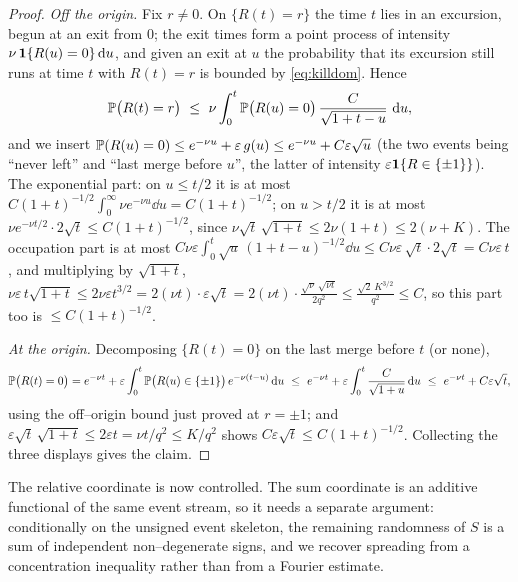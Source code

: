 \documentclass[11pt]{article}
\theoremstyle{plain}
\theoremstyle{definition}
\theoremstyle{remark}
\newcommand{\eps}{\varepsilon}\newcommand{\Exp}{\mathrm{Exp}}
\begin{document}
\begin{proof}
\emph{Off the origin.} Fix $r\ne0$. On $\{R(t)=r\}$ the time $t$ lies in an excursion,
begun at an exit from $0$; the exit times form a point process of intensity
$\nu\,\mathbf 1\{R(u)=0\}\,\mathrm{d} u$, and given an exit at $u$ the probability that its
excursion still runs at time $t$ with $R(t)=r$ is bounded by \eqref{eq:killdom}.
Hence
\[
  \PP\big(R(t)=r\big)\ \le\ \nu\int_0^t\PP\big(R(u)=0\big)\,
  \frac{C}{\sqrt{1+t-u}}\,\dd u,
\]
and we insert $\PP(R(u)=0)\le e^{-\nu u}+\eps\,g(u)\le e^{-\nu u}+C\eps\sqrt u$ (the
two events being ``never left'' and ``last merge before $u$'', the latter of
intensity $\eps\bone\{R\in\{\pm1\}\}$). The exponential part: on $u\le t/2$ it is at
most $C(1+t)^{-1/2}\int_0^\infty\nu e^{-\nu u}\dd u=C(1+t)^{-1/2}$; on $u>t/2$ it is
at most $\nu e^{-\nu t/2}\cdot2\sqrt t\le C(1+t)^{-1/2}$, since
$\nu\sqrt t\,\sqrt{1+t}\le2\nu(1+t)\le2(\nu+K)$. The occupation part is at most
$C\nu\eps\int_0^t\sqrt u\,(1+t-u)^{-1/2}\dd u\le C\nu\eps\,\sqrt t\cdot2\sqrt t
=C\nu\eps\,t$, and multiplying by $\sqrt{1+t}$,
$\nu\eps\,t\sqrt{1+t}\le2\nu\eps t^{3/2}=2(\nu t)\cdot\eps\sqrt t
=2(\nu t)\cdot\frac{\sqrt\nu\,\sqrt{\nu t}}{2q^2}\le\frac{\sqrt2\,K^{3/2}}{q^2}\le C$,
so this part too is $\le C(1+t)^{-1/2}$.

\emph{At the origin.} Decomposing $\{R(t)=0\}$ on the last merge before $t$ (or none),
\[
  \PP\big(R(t)=0\big)=e^{-\nu t}
  +\eps\int_0^t\PP\big(R(u)\in\{\pm1\}\big)\,e^{-\nu(t-u)}\dd u
  \ \le\ e^{-\nu t}+\eps\int_0^t\frac{C}{\sqrt{1+u}}\dd u
  \ \le\ e^{-\nu t}+C\eps\sqrt t,
\]
using the off--origin bound just proved at $r=\pm1$; and
$\eps\sqrt t\,\sqrt{1+t}\le2\eps t=\nu t/q^2\le K/q^2$ shows
$C\eps\sqrt t\le C(1+t)^{-1/2}$. Collecting the three displays gives the claim.
\end{proof}

The relative coordinate is now controlled. The sum coordinate is an additive functional
of the same event stream, so it needs a separate argument: conditionally on the
unsigned event skeleton, the remaining randomness of $S$ is a sum of independent
non--degenerate signs, and we recover spreading from a concentration inequality rather
than from a Fourier estimate.
\end{document}
